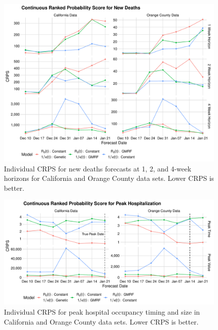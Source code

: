 \begin{figure}
    \centering
    \includegraphics[width=1.0\columnwidth]{real_data_crps_comparison_data_new_deaths_plot}
    \caption{Individual CRPS for new deaths forecasts at 1, 2, and 4-week horizons for California and Orange County data sets. Lower CRPS is better.}
    \label{ch_5:fig:real_data_crps_comparison_data_new_deaths_plot}
\end{figure}

\begin{figure}
    \centering
    \includegraphics[width=1.0\columnwidth]{real_data_peak_crps_plot}
    \caption[Individual CRPS for peak hospital occupancy in real data sets.]{Individual CRPS for peak hospital occupancy timing and size in California and Orange County data sets. Lower CRPS is better.}
    \label{ch_5:fig:real_data_peak_crps_plot}
\end{figure}

\label{ch_5:sec:real_cases_icu_death}

